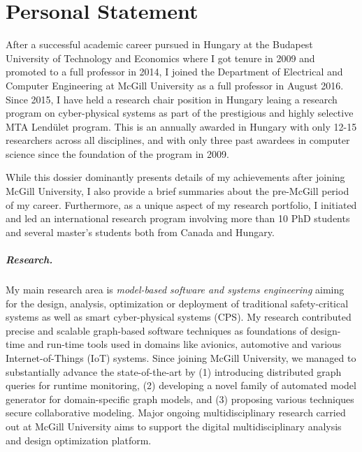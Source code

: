\chapter{Personal Statement}

After a successful academic career pursued in Hungary at the Budapest University of Technology and Economics where I got tenure in 2009 and promoted to a full professor in 2014, I joined the Department of Electrical and Computer Engineering at McGill University as a full professor in August 2016. Since 2015, I have held a research chair position in Hungary leaing a research program on cyber-physical systems as part of the prestigious and highly selective MTA Lendület program. 
This is an annually awarded in Hungary with only 12-15 researchers across all disciplines, and with only three past awardees in computer science since the foundation of the program in 2009. 

While this dossier dominantly presents details of my achievements after joining McGill University, I also provide a brief summaries about the pre-McGill period of my career. Furthermore, as a unique aspect of my research portfolio, I initiated and led an international research program involving more than 10 PhD students and several master's students both from Canada and Hungary.

\paragraph{Research.}
My main research area is \emph{model-based software and systems engineering} aiming for the design, analysis, optimization or deployment of traditional safety-critical systems as well as smart cyber-physical systems (CPS). My research contributed precise and scalable graph-based software techniques as foundations of design-time and run-time tools used in domains like avionics, automotive and various Internet-of-Things (IoT) systems. Since joining McGill University, we managed to substantially advance the state-of-the-art by (1) introducing distributed graph queries for runtime monitoring, (2) developing a novel family of automated model generator for domain-specific graph models, and (3) proposing various techniques secure collaborative modeling. Major ongoing multidisciplinary research carried out at McGill University aims to support the digital multidisciplinary analysis and design optimization platform.

